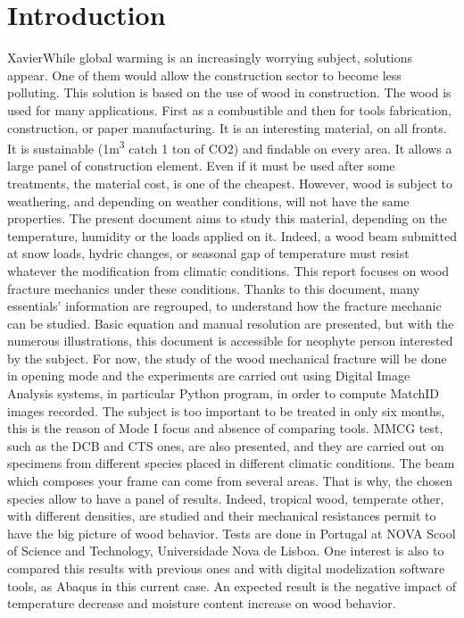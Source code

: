 
\chapter{Introduction} %

\label{Introduction} %


XavierWhile global warming is an increasingly worrying subject, solutions appear. One of them would allow the construction sector to become less polluting. This solution is based on the use of wood in construction. The wood is used for many applications. First as a combustible and then for tools fabrication, construction, or paper manufacturing. It is an interesting material, on all fronts. It is sustainable (1\si{\cubic\meter} catch 1 ton of CO2) and findable on every area. It allows a large panel of construction element. Even if it must be used after some treatments, the material cost, is one of the cheapest. However, wood is subject to weathering, and depending on weather conditions, will not have the same properties. The present document aims to study this material, depending on the temperature, humidity or the loads applied on it. Indeed, a wood beam submitted at snow loads, hydric changes, or seasonal gap of temperature must resist whatever the modification from climatic conditions. This report focuses on wood fracture mechanics under these conditions.
\newline 
Thanks to this document, many essentials' information are regrouped, to understand how the fracture mechanic can be studied. Basic equation and manual resolution are presented, but with the numerous illustrations, this document is accessible for neophyte person interested by the subject.
For now, the study of the wood mechanical fracture will be done in opening mode and the experiments are carried out using Digital Image Analysis systems, in particular Python program, in order to compute MatchID images recorded. The subject is too important to be treated in only six months, this is the reason of Mode I focus and absence of comparing tools. 
\newline
MMCG test, such as the DCB and CTS ones, are also presented, and they are carried out on specimens from different species placed in different climatic conditions. The beam which composes your frame can come from several areas. That is why, the chosen species allow to have a panel of results. Indeed, tropical wood, temperate other, with different densities, are studied and their mechanical resistances permit to have the big picture of wood behavior. 
\newline
Tests are done in Portugal at NOVA Scool of Science and Technology, Universidade Nova de Lisboa. One interest is also to compared this results with previous ones and with digital modelization software tools, as Abaqus in this current case. An expected result is the negative impact of temperature decrease and moisture content increase on wood behavior.